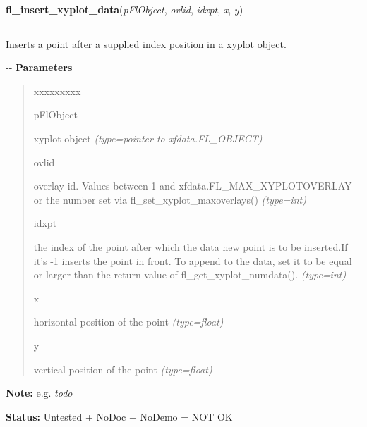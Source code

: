     \label{xformslib:flxyplot:fl_insert_xyplot_data}

    \vspace{0.5ex}

\hspace{.8\funcindent}\begin{boxedminipage}{\funcwidth}

    \raggedright \textbf{fl\_insert\_xyplot\_data}(\textit{pFlObject}, \textit{ovlid}, \textit{idxpt}, \textit{x}, \textit{y})

    \vspace{-1.5ex}

    \rule{\textwidth}{0.5\fboxrule}
\setlength{\parskip}{2ex}

Inserts a point after a supplied index position in a xyplot object.

-{}-
\setlength{\parskip}{1ex}
      \textbf{Parameters}
      \vspace{-1ex}

      \begin{quote}
        \begin{Ventry}{xxxxxxxxx}

          \item[pFlObject]


xyplot object
            {\it (type=pointer to xfdata.FL\_OBJECT)}

          \item[ovlid]


overlay id. Values between 1 and xfdata.FL\_MAX\_XYPLOTOVERLAY or the
number set via fl\_set\_xyplot\_maxoverlays()
            {\it (type=int)}

          \item[idxpt]


the index of the point after which the data new point is to be
inserted.If it's -1 inserts the point in front. To append to the data,
set it to be equal or larger than the return value of
fl\_get\_xyplot\_numdata().
            {\it (type=int)}

          \item[x]


horizontal position of the point
            {\it (type=float)}

          \item[y]


vertical position of the point
            {\it (type=float)}

        \end{Ventry}

      \end{quote}

\textbf{Note:} 
e.g. \emph{todo}


\textbf{Status:} 
Untested + NoDoc + NoDemo = NOT OK


    \end{boxedminipage}

